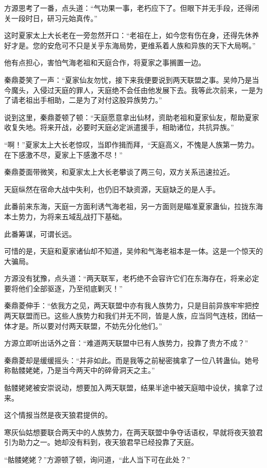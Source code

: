 \begin{this_body}
方源思考了一番，点头道：“气功果一事，老朽应下了。但眼下并无手段，还得闭关一段时日，研习元始真传。”

这时夏家太上大长老在一旁忽然开口：“老祖在上，如今您有伤在身，还得先休养好才是。您的安危可不只是关乎东海局势，更维系着人族和异族的天下大局啊。”

他有点担心，害怕气海老祖和天庭合作，将夏家之事搁置一边。

秦鼎菱笑了一声：“夏家仙友勿忧，接下来我便要说到两天联盟之事。吴帅乃是当今魔头，入侵过天庭的罪人，天庭绝不会任由他发展下去。我等此次前来，一是为了请老祖出手相助，二是为了对付这股异族势力。”

说到这里，秦鼎菱顿了顿：“天庭愿意拿出仙材，资助老祖和夏家仙友，帮助夏家收复失地。将来开战，必要时天庭必定派遣援手，相助诸位，共抗异族。”

“啊！”夏家太上大长老惊叹，当即作揖而拜，“天庭高义，不愧是人族第一势力。在下感激不尽，夏家上下感激不尽！”

秦鼎菱面带微笑，和夏家太上大长老攀谈了两三句，双方关系迅速拉近。

天庭纵然在宿命大战中失利，也仍旧不缺资源，天庭缺乏的是人手。

此番前来东海，天庭一方面利诱气海老祖，另一方面则是瞄准夏家蛊仙，拉拢东海本土势力，为将来五域乱战打下基础。

此番筹谋，可谓长远。

可惜的是，天庭和夏家诸仙却不知道，吴帅和气海老祖本是一体。这是一个惊天的大骗局。

方源没有犹豫，点头道：“两天联军，老朽绝不会容许它们在东海存在，将来必定要将他们全部驱逐，乃至彻底剿灭！”

秦鼎菱伸手：“依我方之见，两天联盟中亦有我人族势力，只是目前异族牢牢把控两天联盟而已。这些人族势力和我们并无不同，皆是人族，应当同气连枝，团结一体才是。所以要对付两天联盟，不妨先分化他们。”

方源立即听出话外之音：“难道两天联盟中已有人族势力，投靠了贵方不成？”

秦鼎菱却是缓缓摇头：“并非如此。而是我等之前秘密擒拿了一位八转蛊仙。她号称骷髅姥姥，乃是当今两天中的碎骨洞天之主。”

骷髅姥姥被安崇说动，想要加入两天联盟，结果半途中被天庭暗中设伏，擒拿了过来。

这个情报当然是夜天狼君提供的。

寒灰仙姑想要联合两天中的人族势力，在两天联盟中争夺话语权，早就将夜天狼君引为助力之一。她却没有料到，夜天狼君早已经投靠了天庭。

“骷髅姥姥？”方源顿了顿，询问道，“此人当下可在此处？”


\end{this_body}
